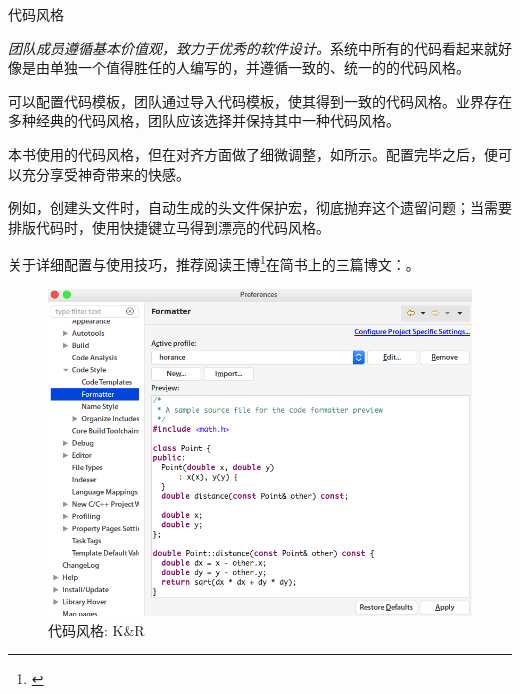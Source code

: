\begin{content}
\begin{episode}{代码风格}

\begin{content}

\emph{团队成员遵循基本价值观，致力于优秀的软件设计。}系统中所有的代码看起来就好像是由单独一个值得胜任的人编写的，并遵循一致的、统一的的代码风格。

可以配置代码模板，团队通过导入代码模板，使其得到一致的代码风格。业界存在多种经典的代码风格，团队应该选择并保持其中一种代码风格。

\begin{enum}
\end{enum}

本书使用的代码风格，但在对齐方面做了细微调整，如所示。配置完毕之后，便可以充分享受神奇带来的快感。

例如，创建头文件时，自动生成的头文件保护宏，彻底抛弃这个遗留问题；当需要排版代码时，使用快捷键立马得到漂亮的代码风格。

关于详细配置与使用技巧，推荐阅读王博\footnote{\href{https://www.jianshu.com/u/92b7d9879f20}{}}在简书上的三篇博文：\href{https://www.jianshu.com/p/dafcdce1f9cb}{}。

\begin{figure}[H]
\centering
\includegraphics[width=1.0\textwidth]{figures/xunit/eclipse-formatter.png}
\caption{代码风格: K\&R}
 \label{fig:eclipse-formatter}
\end{figure}


\end{content}
\end{episode}
\end{content}
